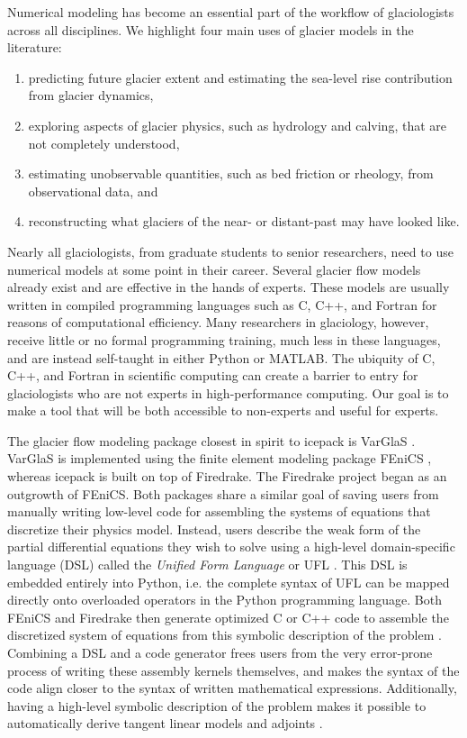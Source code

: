 \documentclass{article}
\theoremstyle{definition}
\theoremstyle{plain}
\begin{document}
Numerical modeling has become an essential part of the workflow of glaciologists across all disciplines.
We highlight four main uses of glacier models in the literature:
\begin{enumerate}
    \item predicting future glacier extent and estimating the sea-level rise contribution from glacier dynamics,
    \item exploring aspects of glacier physics, such as hydrology and calving, that are not completely understood,
    \item estimating unobservable quantities, such as bed friction or rheology, from observational data, and
    \item reconstructing what glaciers of the near- or distant-past may have looked like.
\end{enumerate}
Nearly all glaciologists, from graduate students to senior researchers, need to use numerical models at some point in their career.
Several glacier flow models already exist and are effective in the hands of experts.
These models are usually written in compiled programming languages such as C, C++, and Fortran for reasons of computational efficiency.
Many researchers in glaciology, however, receive little or no formal programming training, much less in these languages, and are instead self-taught in either Python or MATLAB.
The ubiquity of C, C++, and Fortran in scientific computing can create a barrier to entry for glaciologists who are not experts in high-performance computing.
Our goal is to make a tool that will be both accessible to non-experts and useful for experts.

The glacier flow modeling package closest in spirit to icepack is VarGlaS \citep{brinkerhoff2013data}.
VarGlaS is implemented using the finite element modeling package FEniCS \citep{logg2012automated}, whereas icepack is built on top of Firedrake.
The Firedrake project began as an outgrowth of FEniCS.
Both packages share a similar goal of saving users from manually writing low-level code for assembling the systems of equations that discretize their physics model.
Instead, users describe the weak form of the partial differential equations they wish to solve using a high-level domain-specific language (DSL) called the \emph{Unified Form Language} or UFL \citep{alnaes2014unified}.
This DSL is embedded entirely into Python, i.e. the complete syntax of UFL can be mapped directly onto overloaded operators in the Python programming language.
Both FEniCS and Firedrake then generate optimized C or C++ code to assemble the discretized system of equations from this symbolic description of the problem \citep{kirby2006compiler, rathgeber2016firedrake}.
Combining a DSL and a code generator frees users from the very error-prone process of writing these assembly kernels themselves, and makes the syntax of the code align closer to the syntax of written mathematical expressions.
Additionally, having a high-level symbolic description of the problem makes it possible to automatically derive tangent linear models and adjoints \citep{mitusch2019dolfin}.
\end{document}

